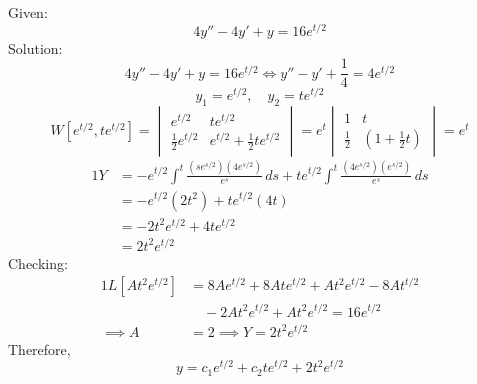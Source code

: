 \documentclass[diffeq.tex]{subfiles}
\begin{document}
\begin{homework*}[146.3]
    Given:
    \begin{equation}
        4y'' - 4y' + y = 16e^{t/2}
    \end{equation}
    Solution:
    \begin{equation}
        4y'' - 4y' + y = 16e^{t/2} \iff y'' - y' + \frac{1}{4} = 4e^{t/2}
    \end{equation}
    \begin{equation}
        y_{1} = e^{t/2},\quad y_{2} = te^{t/2}
    \end{equation}
    \begin{equation}
        W[e^{t/2}, te^{t/2}] = \begin{vmatrix}
            e^{t/2} & te^{t/2} \\
            \frac{1}{2}e^{t/2} & e^{t/2} + \frac{1}{2}te^{t/2}
        \end{vmatrix} = e^{t} \begin{vmatrix}
            1 & t \\
            \frac{1}{2} & \left(1 + \frac{1}{2}t\right)
        \end{vmatrix} = e^{t}
    \end{equation}
    \begin{alignat}{1}
        Y &= -e^{t/2}\int^{t}\frac{(se^{s/2})(4e^{s/2})}{e^{s}}\,ds + te^{t/2}\int^{t}\frac{(4e^{s/2})(e^{s/2})}{e^{s}}\,ds\\
        &= -e^{t/2}(2t^{2}) + te^{t/2}(4t)\\
        &= -2t^{2}e^{t/2} + 4te^{t/2}\\
        &= 2t^{2}e^{t/2}
    \end{alignat}
    Checking:
    \begin{alignat}{1}
        L[At^{2}e^{t/2}] &= 8Ae^{t/2} + 8Ate^{t/2} + At^{2}e^{t/2} - 8At^{t/2}\\
        &\quad - 2At^{2}e^{t/2} + At^{2}e^{t/2} = 16e^{t/2}\\
        \implies A &= 2 \implies Y = 2t^{2}e^{t/2}
    \end{alignat}
    Therefore,
    \begin{equation}
        y = c_{1}e^{t/2} + c_{2}te^{t/2} + 2t^{2}e^{t/2}
    \end{equation}
\end{homework*}
\end{document}
